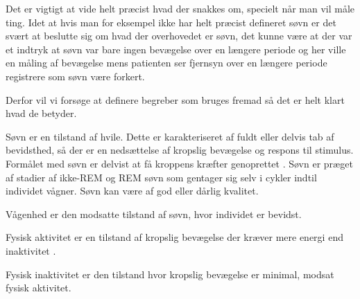 Det er vigtigt at vide helt præcist hvad der snakkes om, specielt når man vil måle ting. Idet at hvis man for eksempel ikke har helt præcist defineret søvn er det svært at beslutte sig om hvad der overhovedet er søvn, det kunne være at der var et indtryk at søvn var bare ingen bevægelse over en længere periode og her ville en måling af bevægelse mens patienten ser fjernsyn over en længere periode registrere som søvn være forkert. 

Derfor vil vi forsøge at definere begreber som bruges fremad så det er helt klart hvad de betyder.

\begin{description}[style=nextline]
	\item[Søvn] Søvn er en tilstand af hvile. Dette er karakteriseret af fuldt eller delvis tab af bevidsthed, så der er en nedsættelse af kropslig bevægelse og respons til stimulus. Formålet med søvn er delvist at få kroppens kræfter genoprettet \citep{misc:SleepDefinition}. Søvn er præget af stadier af ikke-REM og REM søvn som gentager sig selv i cykler indtil individet vågner. Søvn kan være af god eller dårlig kvalitet. 
	\item[Vågenhed] Vågenhed er den modsatte tilstand af søvn, hvor individet er bevidst.
	\item[Fysisk aktivitet] Fysisk aktivitet er en tilstand af kropslig bevægelse der kræver mere energi end inaktivitet \citep{misc:PhysicalActivity}.
	\item[Fysisk inaktivitet] Fysisk inaktivitet er den tilstand hvor kropslig bevægelse er minimal, modsat fysisk aktivitet.
\end{description}